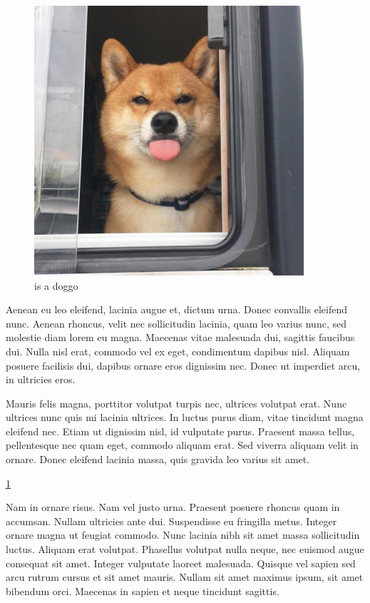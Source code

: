\documentclass[a4paper]{article}
\begin{document}
\begin{figure}
\centerline{\includegraphics[width=10cm]{85708057.jpg}}
\caption{is a doggo}
\label{myPicture}
\end{figure}

Aenean eu leo eleifend, lacinia augue et, dictum urna. Donec convallis eleifend nunc. Aenean rhoncus, velit nec sollicitudin lacinia, quam leo varius nunc, sed molestie diam lorem eu magna. Maecenas vitae malesuada dui, sagittis faucibus dui. Nulla nisl erat, commodo vel ex eget, condimentum dapibus nisl. Aliquam posuere facilisis dui, dapibus ornare eros dignissim nec. Donec ut imperdiet arcu, in ultricies eros.

Mauris felis magna, porttitor volutpat turpis nec, ultrices volutpat erat. Nunc ultrices nunc quis mi lacinia ultrices. In luctus purus diam, vitae tincidunt magna eleifend nec. Etiam ut dignissim nisl, id vulputate purus. Praesent massa tellus, pellentesque nec quam eget, commodo aliquam erat. Sed viverra aliquam velit in ornare. Donec eleifend lacinia massa, quis gravida leo varius sit amet.

\ref{myPicture}

Nam in ornare risus. Nam vel justo urna. Praesent posuere rhoncus quam in accumsan. Nullam ultricies ante dui. Suspendisse eu fringilla metus. Integer ornare magna ut feugiat commodo. Nunc lacinia nibh sit amet massa sollicitudin luctus. Aliquam erat volutpat. Phasellus volutpat nulla neque, nec euismod augue consequat sit amet. Integer vulputate laoreet malesuada. Quisque vel sapien sed arcu rutrum cursus et sit amet mauris. Nullam sit amet maximus ipsum, sit amet bibendum orci. Maecenas in sapien et neque tincidunt sagittis.
\end{document}
